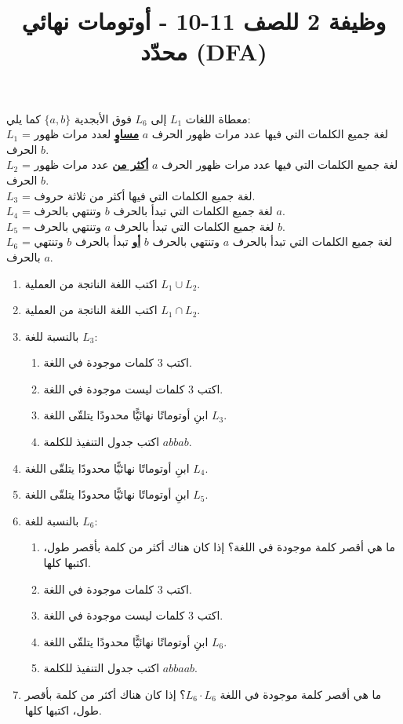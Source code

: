 \documentclass[12pt]{article}
\title{وظيفة 2 للصف 11-10 - أوتومات نهائي محدّد (DFA)}
\begin{document}
\maketitle

\begin{boxCode}
    معطاة اللغات $L_1$ إلى $L_6$ فوق الأبجدية $\{a,b\}$ كما يلي: \\
    $L_1$ = لغة جميع الكلمات التي فيها عدد مرات ظهور الحرف $a$ \underline{\textbf{مساوٍ}} لعدد مرات ظهور الحرف $b$. \\
    $L_2$ = لغة جميع الكلمات التي فيها عدد مرات ظهور الحرف $a$ \underline{\textbf{أكثر من}} عدد مرات ظهور الحرف $b$. \\
    $L_3$ = لغة جميع الكلمات التي فيها أكثر من ثلاثة حروف. \\
    $L_4$ = لغة جميع الكلمات التي تبدأ بالحرف $b$ وتنتهي بالحرف $a$. \\
    $L_5$ = لغة جميع الكلمات التي تبدأ بالحرف $a$ وتنتهي بالحرف $b$. \\
    $L_6$ = لغة جميع الكلمات التي تبدأ بالحرف $a$ وتنتهي بالحرف $b$ \underline{\textbf{أو}} تبدأ بالحرف $b$ وتنتهي بالحرف $a$.
\end{boxCode}

\begin{enumerate}

    \item اكتب اللغة الناتجة من العملية $L_1 \cup L_2$.
    \item اكتب اللغة الناتجة من العملية $L_1 \cap L_2$.
    \item بالنسبة للغة $L_3$:
  \begin{enumerate}
    \item اكتب 3 كلمات موجودة في اللغة.
    \item اكتب 3 كلمات ليست موجودة في اللغة.
    \item ابنِ أوتوماتًا نهائيًّا محدودًا يتلقّى اللغة $L_3$.
    \item اكتب جدول التنفيذ للكلمة $abbab$.
\end{enumerate}

\item ابنِ أوتوماتًا نهائيًّا محدودًا يتلقّى اللغة $L_4$.
\item ابنِ أوتوماتًا نهائيًّا محدودًا يتلقّى اللغة $L_5$.

\clearpage
\item بالنسبة للغة $L_6$:
  \begin{enumerate}
    \item ما هي أقصر كلمة موجودة في اللغة؟ إذا كان هناك أكثر من كلمة بأقصر طول، اكتبها كلها.
    \item اكتب 3 كلمات موجودة في اللغة.
    \item اكتب 3 كلمات ليست موجودة في اللغة.
    \item ابنِ أوتوماتًا نهائيًّا محدودًا يتلقّى اللغة $L_6$.
    \item اكتب جدول التنفيذ للكلمة $abbaab$.
  \end{enumerate}

  \item ما هي أقصر كلمة موجودة في اللغة $L_6 \cdot L_6$؟ إذا كان هناك أكثر من كلمة بأقصر طول، اكتبها كلها.
\end{enumerate}
\end{document}
